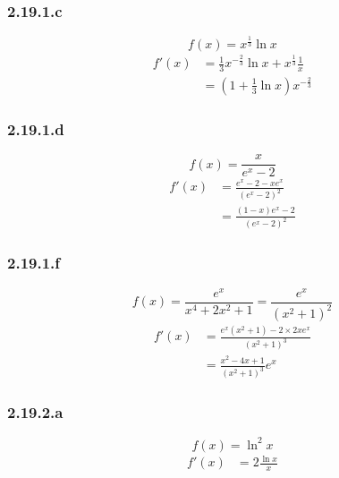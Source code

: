 \documentclass{report}
\begin{document}
\subsubsection*{2.19.1.c}
\begin{displaymath}
	f(x) = x^{\frac{1}{3}} \ln x
\end{displaymath}
\begin{equation*}
	\begin{split}
		f'(x) &= \frac{1}{3} x^{-\frac{2}{3}} \ln x + x^{\frac{1}{3}} \frac{1}{x} \\
		      &=\left(1 + \frac{1}{3}\ln x \right) x^{-\frac{2}{3}}
	\end{split}	
\end{equation*}

\subsubsection*{2.19.1.d}
\begin{displaymath}
	f(x) = \frac{x}{e^x-2}
\end{displaymath}
\begin{equation*}
	\begin{split}
		f'(x) &= \frac{e^x-2 - xe^x}{(e^x-2)^2} \\
		      &= \frac{(1-x)e^x-2}{(e^x-2)^2} 
	\end{split}	
\end{equation*}

\subsubsection*{2.19.1.f}
\begin{displaymath}
	f(x) = \frac{e^x}{x^4 + 2x^2 +1} =\frac{e^x}{(x^2 +1)^2}
\end{displaymath}
\begin{equation*}
	\begin{split}
		f'(x) &= \frac{e^x(x^2+1)-2 \times 2xe^x}{(x^2 +1)^3} \\
		      &= \frac{x^2 - 4x + 1}{(x^2 +1)^3}e^x
	\end{split}	
\end{equation*}



\subsubsection*{2.19.2.a}
\begin{displaymath}
	f(x) = \ln^2 x
\end{displaymath}
\begin{equation*}
	\begin{split}
		f'(x) &= 2\frac{\ln x}{x}
	\end{split}	
\end{equation*}
\end{document}
